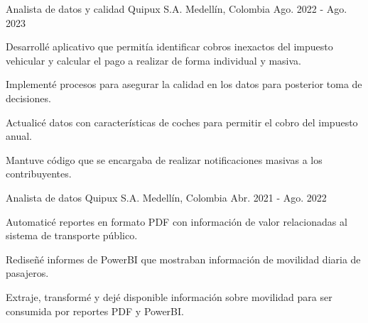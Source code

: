 


\begin{cventries}


\cventry
{Analista de datos y calidad} %
{Quipux S.A.} %
{Medellín, Colombia} %
{Ago. 2022 - Ago. 2023} %
{ %
\begin{cvitems}
\item {Desarrollé aplicativo que permitía identificar cobros inexactos del impuesto vehicular y calcular el pago a realizar de forma individual y masiva.}
\item {Implementé procesos para asegurar la calidad en los datos para posterior toma de decisiones.}
\item {Actualicé datos con características de coches para permitir el cobro del impuesto anual.}
\item {Mantuve código que se encargaba de realizar notificaciones masivas a los contribuyentes.\hfill \break}
\end{cvitems}
}


\cventry
{Analista de datos} %
{Quipux S.A.} %
{Medellín, Colombia   } %
{Abr. 2021 - Ago. 2022} %
{ %
\begin{cvitems}
\item {Automaticé reportes en formato PDF con información de valor relacionadas al sistema de transporte público.}
\item {Rediseñé informes de PowerBI que mostraban información de movilidad diaria de pasajeros.}
\item {Extraje, transformé y dejé disponible información sobre movilidad para ser consumida por reportes PDF y PowerBI.}
\end{cvitems}
}



\end{cventries}
